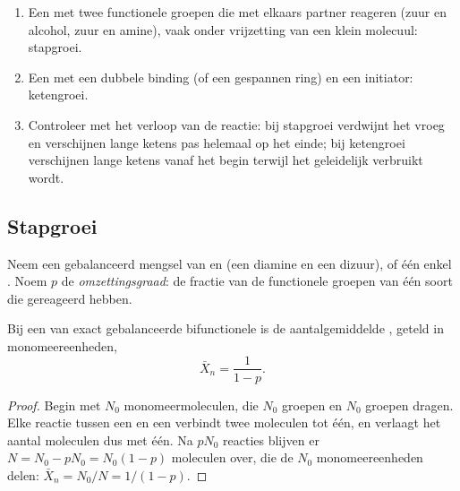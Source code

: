 \begin{method}\label{met:b2:polymer-synthesis:classify}
\begin{enumerate}
  \item Een  met twee functionele groepen die met elkaars partner reageren (zuur en alcohol,
        zuur en amine), vaak onder vrijzetting van een klein molecuul: stapgroei.
  \item Een  met een dubbele binding  (of een gespannen ring) en een initiator: ketengroei.
  \item Controleer met het verloop van de reactie: bij stapgroei verdwijnt het  vroeg en verschijnen lange ketens
        pas helemaal op het einde; bij ketengroei verschijnen lange ketens vanaf het begin terwijl het 
        geleidelijk verbruikt wordt.
\end{enumerate}
\end{method}

\subsection*{Stapgroei}

Neem een gebalanceerd mengsel van   en  (een diamine en een dizuur), of één enkel
 . Noem $p$ de \emph{omzettingsgraad}: de fractie van de functionele groepen van één
soort die gereageerd hebben.

\begin{theorem}\label{thm:b2:polymer-synthesis:carothers}
Bij een  van exact gebalanceerde bifunctionele  is de aantalgemiddelde
, geteld in monomeereenheden,
\begin{equation*}
\bar X_n = \frac{1}{1 - p}.
\end{equation*}
\end{theorem}

\begin{proof}
Begin met $N_0$ monomeermoleculen, die $N_0$ groepen  en $N_0$ groepen  dragen. Elke reactie
tussen een  en een  verbindt twee moleculen tot één, en verlaagt het aantal moleculen dus met
één. Na $pN_0$ reacties blijven er $N = N_0 - pN_0 = N_0(1-p)$ moleculen over, die de $N_0$ monomeereenheden
delen: $\bar X_n = N_0/N = 1/(1-p)$.
\end{proof}

